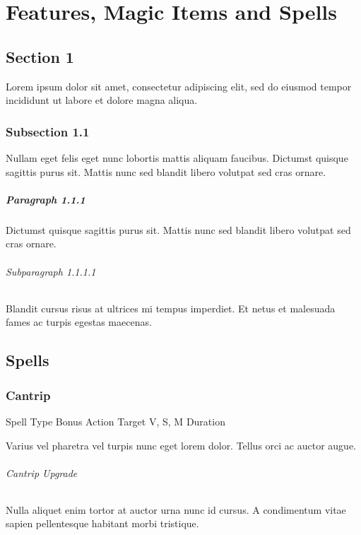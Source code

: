 \documentclass[letterpaper,openany,oneside,twocolumn]{book}
\begin{document}
\onecolumn


\rendercharactersheet

\renderbackgroundsheet

\renderspellsheet

\renderoldspellsheet


\restoregeometry
\twocolumn

\chapter*{Features, Magic Items and Spells}

\section*{Section 1}
Lorem ipsum dolor sit amet, consectetur adipiscing elit, sed do eiusmod tempor incididunt ut labore et dolore magna aliqua.
\subsection*{Subsection 1.1}
Nullam eget felis eget nunc lobortis mattis aliquam faucibus. Dictumst quisque sagittis purus sit. Mattis nunc sed blandit libero volutpat sed cras ornare.
\paragraph*{Paragraph 1.1.1}
Dictumst quisque sagittis purus sit. Mattis nunc sed blandit libero volutpat sed cras ornare.
\subparagraph*{Subparagraph 1.1.1.1}
Blandit cursus risus at ultrices mi tempus imperdiet. Et netus et malesuada fames ac turpis egestas maecenas.

\section*{Spells}
\subsection*{Cantrip}

	{Spell Type}
	{Bonus Action}
	{Target}
	{V, S, M}
	{Duration}

Varius vel pharetra vel turpis nunc eget lorem dolor. Tellus orci ac auctor augue.

\subparagraph*{Cantrip Upgrade} Nulla aliquet enim tortor at auctor urna nunc id cursus. A condimentum vitae sapien pellentesque habitant morbi tristique.
\end{document}
